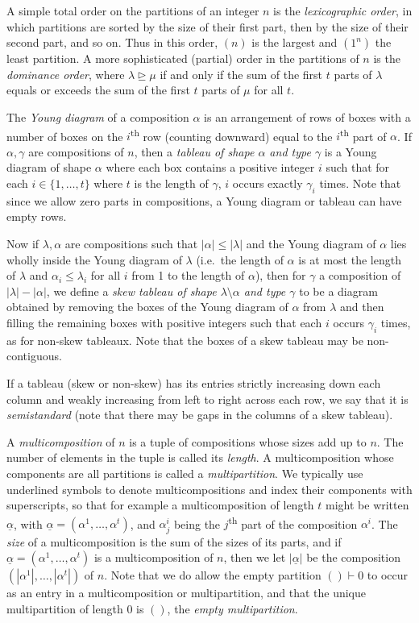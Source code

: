 \documentclass[10pt]{article}
\theoremstyle{definition}
\providecommand{\ie}{i.e.\ }
\newcommand{\tss}[1]{\textsuperscript{#1}}
\newcommand{\ul}[1]{\underline{#1}}
\begin{document}
A simple total order on the partitions of an integer $n$ is the \textit{lexicographic order}, in which partitions are sorted by the
size of their first part, then by the size of their second part, and so on. Thus in this order, $(n)$ is the largest and $(1^n)$ the
least partition.
A more sophisticated (partial) order in the partitions of $n$ is the \textit{dominance order}, where $\lambda \trianglerighteq \mu$ if and
only if the sum of the first $t$ parts of $\lambda$ equals or exceeds the sum of the first $t$ parts of $\mu$ for all $t$.

The \textit{Young diagram} of a composition $\alpha$ is an arrangement of rows of boxes with a number of boxes on the $i$\tss{th} row
(counting downward) equal to the $i$\tss{th} part of $\alpha$.
If $\alpha,\gamma$ are compositions of $n$, then a \textit{tableau of shape $\alpha$ and type $\gamma$} is a Young diagram of shape
$\alpha$ where each box contains a positive integer $i$ such that for each $i \in \{1,\ldots,t\}$ where $t$ is the length of $\gamma$,
$i$ occurs exactly $\gamma_i$ times.
Note that since we allow zero parts in compositions, a Young diagram or tableau can have empty rows.

Now if $\lambda,\alpha$ are compositions such that $|\alpha|\leq|\lambda|$ and the Young diagram of $\alpha$ lies wholly inside the Young
diagram of $\lambda$ (\ie the length of $\alpha$ is at most the length of $\lambda$ and $\alpha_i \leq \lambda_i$ for all $i$ from 1 to
the length of $\alpha$), then for $\gamma$ a composition of $|\lambda|-|\alpha|$, we define a \textit{skew tableau of shape $\lambda
\setminus \alpha$ and type $\gamma$} to be a diagram obtained by removing the boxes of the Young diagram of $\alpha$ from $\lambda$ and
then filling the remaining boxes with positive integers such that each $i$ occurs $\gamma_i$ times, as for non-skew tableaux. Note that
the boxes of a skew tableau may be non-contiguous.

If a tableau (skew or non-skew) has its entries strictly increasing down each column and weakly increasing from left to right across each
row, we say that it is \textit{semistandard} (note that there may be gaps in the columns of a skew tableau).

A \textit{multicomposition} of $n$ is a tuple of compositions whose sizes add up to $n$. The number of elements in the tuple is called
its \textit{length}. A multicomposition whose components are all partitions is called a \textit{multipartition}. We typically use
underlined symbols to denote multicompositions and index their components with superscripts, so that for example a multicomposition of
length $t$ might be written $\ul{\alpha}$, with $\ul{\alpha} = (\alpha^1,\ldots,\alpha^t)$, and $\alpha^i_j$ being the $j$\tss{th} part
of the composition $\alpha^i$. The \textit{size} of a multicomposition is the sum of the sizes of its parts, and if
$\ul{\alpha} = (\alpha^1,\ldots,\alpha^t)$ is a multicomposition of $n$, then we let $|\ul{\alpha}|$ be the composition
$(|\alpha^1|,\ldots,|\alpha^t|)$ of $n$. Note that we do allow the empty partition $() \vdash 0$ to occur as an entry in a
multicomposition or multipartition, and that the unique multipartition of length 0 is $()$, the \textit{empty multipartition}.
\end{document}
